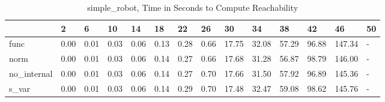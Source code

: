\begin{table}
\caption{simple_robot, Time in Seconds to Compute Reachability}
\label{simple_robot_states_time}
\begin{tabular}{llllllllllllll}
\toprule
 & 2 & 6 & 10 & 14 & 18 & 22 & 26 & 30 & 34 & 38 & 42 & 46 & 50 \\
\midrule
func & 0.00 & 0.01 & 0.03 & 0.06 & 0.13 & 0.28 & 0.66 & 17.75 & 32.08 & 57.29 & 96.88 & 147.34 & - \\
norm & 0.00 & 0.01 & 0.03 & 0.06 & 0.14 & 0.27 & 0.66 & 17.68 & 31.28 & 56.87 & 98.79 & 146.00 & - \\
no_internal & 0.00 & 0.01 & 0.03 & 0.06 & 0.14 & 0.27 & 0.70 & 17.66 & 31.50 & 57.92 & 96.89 & 145.36 & - \\
s_var & 0.00 & 0.01 & 0.03 & 0.06 & 0.14 & 0.29 & 0.70 & 17.48 & 32.47 & 59.08 & 98.62 & 145.76 & - \\
\bottomrule
\end{tabular}
\end{table}
